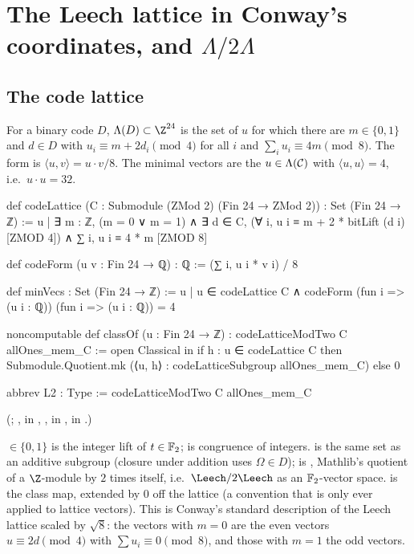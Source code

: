 \section{The Leech lattice in Conway's coordinates, and \texorpdfstring{$\Lambda/2\Lambda$}{Lambda/2Lambda}}\label{ch21:sec:leech}

\subsection{The code lattice}

\begin{definition}\label{ch21:def:codeLattice}
For a binary code $D$, $\Lambda(D)\subset\Z^{24}$ is the set of $u$ for which there are
$m\in\{0,1\}$ and $d\in D$ with $u_i\equiv m+2d_i\pmod 4$ for all $i$ and
$\sum_iu_i\equiv4m\pmod8$.  The form is $\langle u,v\rangle=u\cdot v/8$.  The minimal vectors are the
$u\in\Lambda(\mathcal{C})$ with $\langle u,u\rangle=4$, i.e.\ $u\cdot u=32$.
\end{definition}
\begin{leancode}
def codeLattice (C : Submodule (ZMod 2) (Fin 24 → ZMod 2)) : Set (Fin 24 → ℤ) :=
  {u | ∃ m : ℤ, (m = 0 ∨ m = 1) ∧ ∃ d ∈ C,
    (∀ i, u i ≡ m + 2 * bitLift (d i) [ZMOD 4]) ∧ ∑ i, u i ≡ 4 * m [ZMOD 8]}

def codeForm (u v : Fin 24 → ℚ) : ℚ := (∑ i, u i * v i) / 8
\end{leancode}
\begin{leancode}
def minVecs : Set (Fin 24 → ℤ) :=
  {u | u ∈ codeLattice C ∧ codeForm (fun i => (u i : ℚ)) (fun i => (u i : ℚ)) = 4}
\end{leancode}
\begin{leancode}
noncomputable def classOf (u : Fin 24 → ℤ) : codeLatticeModTwo C allOnes_mem_C :=
  open Classical in
  if h : u ∈ codeLattice C then Submodule.Quotient.mk (⟨u, h⟩ : codeLatticeSubgroup allOnes_mem_C)
  else 0
\end{leancode}
\begin{leancode}
abbrev L2 : Type := codeLatticeModTwo C allOnes_mem_C
\end{leancode}
(; ,  in
, ,  in ,  in
.)
\begin{dictionary}
 $\in\{0,1\}$ is the integer lift of $t\in\mathbb{F}_2$;  is
congruence of integers.   is the same set as an additive subgroup (closure
under addition uses $\Omega\in D$);  is ,
Mathlib's quotient of a $\Z$-module by $2$ times itself, i.e.\ $\Leech/2\Leech$ as an
$\mathbb{F}_2$-vector space.   is the class map, extended by $0$ off the lattice (a
convention that is only ever applied to lattice vectors).  This is Conway's standard description of
the Leech lattice scaled by $\sqrt8$: the vectors with $m=0$ are the even vectors $u\equiv2d\pmod4$
with $\sum u_i\equiv0\pmod8$, and those with $m=1$ the odd vectors.
\end{dictionary}
